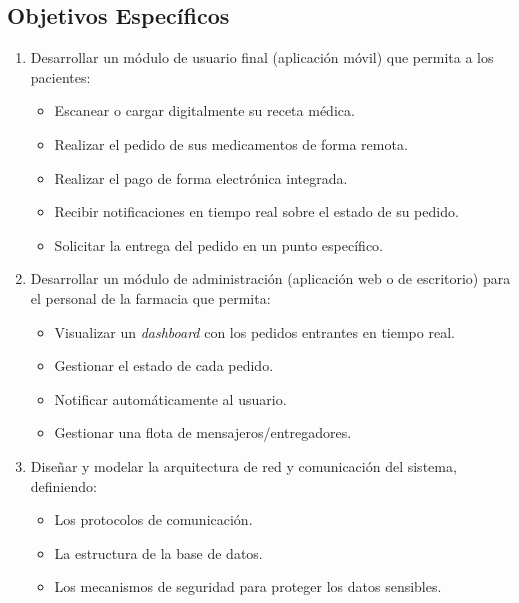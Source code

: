 \subsection{Objetivos Específicos}
\label{subsec:objetivos-especificos}

\begin{enumerate}
    \item Desarrollar un módulo de usuario final (aplicación móvil) que permita a los pacientes:
    \begin{itemize}
        \item Escanear o cargar digitalmente su receta médica.
        \item Realizar el pedido de sus medicamentos de forma remota.
        \item Realizar el pago de forma electrónica integrada.
        \item Recibir notificaciones en tiempo real sobre el estado de su pedido.
        \item Solicitar la entrega del pedido en un punto específico.
    \end{itemize}
    
    \item Desarrollar un módulo de administración (aplicación web o de escritorio) para el personal de la farmacia que permita:
    \begin{itemize}
        \item Visualizar un \textit{dashboard} con los pedidos entrantes en tiempo real.
        \item Gestionar el estado de cada pedido.
        \item Notificar automáticamente al usuario.
        \item Gestionar una flota de mensajeros/entregadores.
    \end{itemize}
    
    \item Diseñar y modelar la arquitectura de red y comunicación del sistema, definiendo:
    \begin{itemize}
        \item Los protocolos de comunicación.
        \item La estructura de la base de datos.
        \item Los mecanismos de seguridad para proteger los datos sensibles.
    \end{itemize}
  
\end{enumerate}
